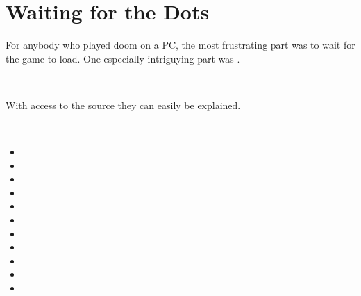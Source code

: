 \section{Waiting for the Dots}
For anybody who played doom on a PC, the most frustrating part was to wait for the game to load. One especially intriguying part was .\\
\par
{}\\
\par
With access to the source they can easily be explained.\\
\par
{}\\
\par
\begin{itemize}
\item {}
\item {}
\item {}
\item {}
\item {}
\item {}
\item {}
\item {}
\item {}
\item {}
\item {}
\end{itemize}